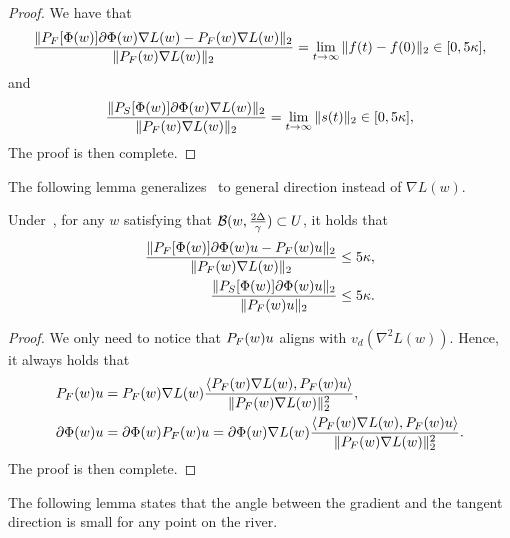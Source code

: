 \begin{proof}
We have that
\begin{align*}
     \frac{\| {P}_F[\Phi(w)] \partial \Phi(w) \nabla L(w) -  {P}_F(w) \nabla L(w) \|_2}{ \| {P}_F(w) \nabla L(w)  \|_2} = \lim_{t \to \infty} \| f(t) - f(0) \|_2 \in [0, 5\kappa],
\end{align*}
and 
\begin{align*}
     \frac{\| {P}_S[\Phi(w)] \partial \Phi(w) \nabla L(w) \|_2}{ \| {P}_F(w) \nabla L(w)  \|_2} = \lim_{t \to \infty} \| s(t) \|_2 \in [0, 5\kappa],
\end{align*}
The proof is then complete.
\end{proof}

The following lemma generalizes~ to general direction instead of $\nabla L(w)$.

\begin{lemma}
\label{lem:boundpartialphigen}
Under~, for any $w$ satisfying that $\mathcal{B}(w, \frac{2 \Delta}{\gamma}) \subset U$,  it holds that 
\begin{align*}
     \frac{\| {P}_F[\Phi(w)] \partial \Phi(w) u -  {P}_F(w) u \|_2}{ \| {P}_F(w) \nabla L(w)  \|_2} &\le 5\kappa,\\
     \frac{\| {P}_S[\Phi(w)] \partial \Phi(w) u  \|_2}{ \| {P}_F(w) u \|_2} &\le 5\kappa.
\end{align*}
\end{lemma}

\begin{proof}
    We only need to notice that ${P}_F(w) u $ aligns with $v_d(\nabla^2 L(w))$. Hence, it always holds that
    \begin{align*}
         {P}_F(w) u &= {P}_F(w) \nabla L(w) \frac{\langle {P}_F(w) \nabla L(w), {P}_F(w) u\rangle}{\| {P}_F(w) \nabla L(w) \|_2^2}, \\
         \partial \Phi(w) u &=  \partial \Phi(w) {P}_F(w) u = \partial \Phi(w) \nabla L(w)  \frac{\langle {P}_F(w) \nabla L(w), {P}_F(w) u\rangle}{\| {P}_F(w) \nabla L(w) \|_2^2}.
    \end{align*}
The proof is then complete.
\end{proof}


The following lemma states that the angle between the gradient and the tangent direction is small for any point on the river.

